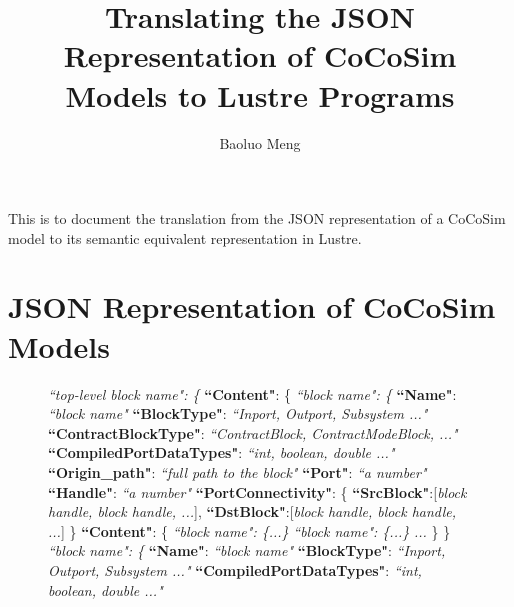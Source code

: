 \documentclass{article}
\begin{document}
\title{Translating the JSON Representation of CoCoSim Models to Lustre Programs}

\author{Baoluo Meng}


\maketitle

This is to document the translation from the JSON representation of a CoCoSim model to its semantic equivalent representation in Lustre.


\section{JSON Representation of CoCoSim Models}
\begin{figure}
\begin{algorithmic}
\State \textit{\textsf{``top-level block name": \{ }}
\State {\ \ \ \ } \textsf{\textbf{``Content"}: \{
\State {\ \ \ \ \ \ \ \ } \textit{``block name": \{} 
\State {\ \ \ \ \ \ \ \ \ \ \ \ } \textbf{``Name"}:  \textit{``block name"} 
\State {\ \ \ \ \ \ \ \ \ \ \ \ } \textbf{``BlockType"}:  \textit{``Inport, Outport, Subsystem ..."} 
\State {\ \ \ \ \ \ \ \ \ \ \ \ } \textbf{``ContractBlockType"}:  \textit{``ContractBlock, ContractModeBlock, ..."} 
\State {\ \ \ \ \ \ \ \ \ \ \ \ } \textbf{``CompiledPortDataTypes"}: \textit{``int, boolean, double ..."} 
\State {\ \ \ \ \ \ \ \ \ \ \ \ } \textbf{``Origin\_path"}: \textit{``full path to the block"} 
\State {\ \ \ \ \ \ \ \ \ \ \ \ } \textbf{``Port"}: \textit{``a number"} 
\State {\ \ \ \ \ \ \ \ \ \ \ \ } \textbf{``Handle"}: \textit{``a number"} 		   
\State {\ \ \ \ \ \ \ \ \ \ \ \ } \textbf{``PortConnectivity"}: \{ 
\State {\ \ \ \ \ \ \ \ \ \ \ \ \ \ \ \ } \textbf{``SrcBlock"}:[\textit{block handle, block handle, ...}], 
\State {\ \ \ \ \ \ \ \ \ \ \ \ \ \ \ \ } \textbf{``DstBlock"}:[\textit{block handle, block handle, ...}]		
\State {\ \ \ \ \ \ \ \ \ \ \ \ }\}	
\State {\ \ \ \ \ \ \ \ \ \ \ \ } \textbf{``Content"}: \{ 
\State {\ \ \ \ \ \ \ \ \ \ \ \ \ \ \ \ }  \textit{``block name": \{...\}} 
\State {\ \ \ \ \ \ \ \ \ \ \ \ \ \ \ \ }  \textit{``block name": \{...\}} 
\State {\ \ \ \ \ \ \ \ \ \ \ \ \ \ \ \ }  \textit{...} 
\State {\ \ \ \ \ \ \ \ \ \ \ \ } \}
\State {\ \ \ \ \ \ \ \ } \}
\State {\ \ \ \ \ \ \ \ } \textit{``block name": \{} 
\State {\ \ \ \ \ \ \ \ \ \ \ \ } \textbf{``Name"}:  \textit{``block name"} 
\State {\ \ \ \ \ \ \ \ \ \ \ \ } \textbf{``BlockType"}:  \textit{``Inport, Outport, Subsystem ..."} 
\State {\ \ \ \ \ \ \ \ \ \ \ \ } \textbf{``CompiledPortDataTypes"}: \textit{``int, boolean, double ..."} 
}
\end{algorithmic}
\end{figure}
\end{document}
